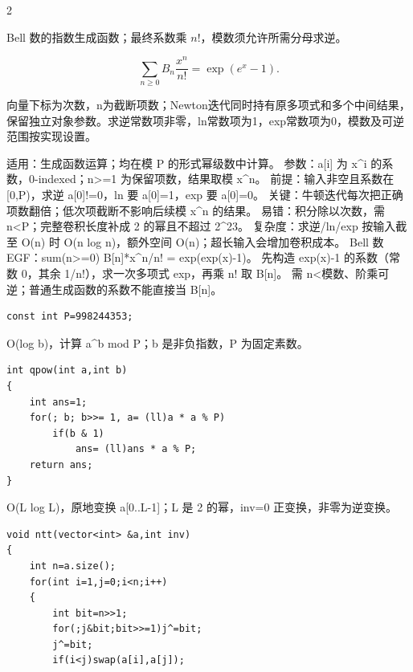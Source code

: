 \documentclass[UTF8,fontset=fandol,a4paper,twoside]{ctexart}
\newcommand{\note}[1]{{\fontsize{10}{12}\selectfont #1\par}}
\begin{document}
\begin{multicols}{2}
\note{Bell 数的指数生成函数；最终系数乘 $n!$，模数须允许所需分母求逆。}
\[
\sum_{n\ge0}B_n\frac{x^n}{n!}=\exp(e^x-1).
\]

\note{向量下标为次数，n为截断项数；Newton迭代同时持有原多项式和多个中间结果，保留独立对象参数。求逆常数项非零，ln常数项为1，exp常数项为0，模数及可逆范围按实现设置。}
\note{适用：生成函数运算；均在模 P 的形式幂级数中计算。 参数：a[\allowbreak{}i]\allowbreak{} 为 x\textasciicircum{}i 的系数，0-\allowbreak{}indexed；n>\allowbreak{}=\allowbreak{}1 为保留项数，结果取模 x\textasciicircum{}n。 前提：输入非空且系数在 [\allowbreak{}0,\allowbreak{}P)\allowbreak{}，求逆 a[\allowbreak{}0]\allowbreak{}!=\allowbreak{}0，ln 要 a[\allowbreak{}0]\allowbreak{}=\allowbreak{}1，exp 要 a[\allowbreak{}0]\allowbreak{}=\allowbreak{}0。 关键：牛顿迭代每次把正确项数翻倍；低次项截断不影响后续模 x\textasciicircum{}n 的结果。 易错：积分除以次数，需 n<\allowbreak{}P；完整卷积长度补成 2 的幂且不超过 2\textasciicircum{}23。 复杂度：求逆/\allowbreak{}ln/\allowbreak{}exp 按输入截至 O(\allowbreak{}n)\allowbreak{} 时 O(\allowbreak{}n log n)\allowbreak{}，额外空间 O(\allowbreak{}n)\allowbreak{}；超长输入会增加卷积成本。 Bell 数 EGF：sum(\allowbreak{}n>\allowbreak{}=\allowbreak{}0)\allowbreak{} B[\allowbreak{}n]\allowbreak{}*x\textasciicircum{}n/\allowbreak{}n! =\allowbreak{} exp(\allowbreak{}exp(\allowbreak{}x)\allowbreak{}-\allowbreak{}1)\allowbreak{}。 先构造 exp(\allowbreak{}x)\allowbreak{}-\allowbreak{}1 的系数（常数 0，其余 1/\allowbreak{}n!），求一次多项式 exp，再乘 n! 取 B[\allowbreak{}n]\allowbreak{}。 需 n<\allowbreak{}模数、阶乘可逆；普通生成函数的系数不能直接当 B[\allowbreak{}n]\allowbreak{}。}
\begin{lstlisting}
const int P=998244353;
\end{lstlisting}
\note{O(\allowbreak{}log b)\allowbreak{}，计算 a\textasciicircum{}b mod P；b 是非负指数，P 为固定素数。}
\begin{lstlisting}
int qpow(int a,int b)
{
    int ans=1;
    for(; b; b>>= 1, a= (ll)a * a % P)
        if(b & 1)
            ans= (ll)ans * a % P;
    return ans;
}
\end{lstlisting}
\note{O(\allowbreak{}L log L)\allowbreak{}，原地变换 a[\allowbreak{}0.\allowbreak{}.\allowbreak{}L-\allowbreak{}1]\allowbreak{}；L 是 2 的幂，inv=\allowbreak{}0 正变换，非零为逆变换。}
\begin{lstlisting}
void ntt(vector<int> &a,int inv)
{
    int n=a.size();
    for(int i=1,j=0;i<n;i++)
    {
        int bit=n>>1;
        for(;j&bit;bit>>=1)j^=bit;
        j^=bit;
        if(i<j)swap(a[i],a[j]);

\end{lstlisting}
\end{multicols}
\end{document}
